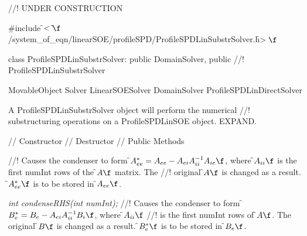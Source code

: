 
//! UNDER CONSTRUCTION

\indent \#include \f$<\tilde{
}\f$/system\_of\_eqn/linearSOE/profileSPD/ProfileSPDLinSubstrSolver.h\f$>\f$ 

\indent class ProfileSPDLinSubstrSolver: public DomainSolver, public
//! ProfileSPDLinSubstrSolver 

\indent  MovableObject
\indent\indent  Solver
\indent\indent\indent  LinearSOESolver
\indent\indent\indent\indent  DomainSolver
\indent\indent\indent\indent  ProfileSPDLinDirectSolver
\indent\indent\indent\indent{}

\indent A ProfileSPDLinSubstrSolver object will perform the numerical
//! substructuring operations on a ProfileSPDLinSOE object. EXPAND.

\indent\indent // Constructor
\indent{}
\indent\indent // Destructor
\indent{}
\indent\indent // Public Methods
\indent{}
\indent{}
\indent{}
\indent{}
\indent{}
\indent{}
\indent{}
\indent{}








//! Causes the condenser to form \f$A_{ee}^* = A_{ee} -A_{ei} A_{ii}^{-1} A_{ie}\f$, where
\f$A_{ii}\f$ is the first \p numInt rows of the \f$A\f$ matrix.  The
//! original \f$A\f$ is changed as a result. \f$A_{ee}^*\f$ is to be stored in \f$A_{ee}\f$.

{\em int condenseRHS(int numInt);}
//! Causes the condenser to form \f$B_e^* = B_e - A_{ei} A_{ii}^{-1} B_i\f$, where \f$A_{ii}\f$ 
//! is the first \p numInt rows of \f$A\f$. The original \f$B\f$ is changed as a result. 
\f$B_e^*\f$ is to be stored in \f$B_e\f$.

